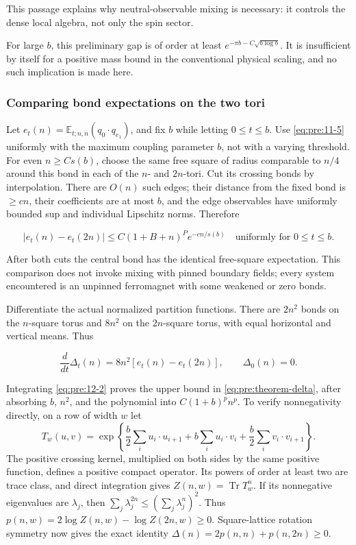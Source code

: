 This passage explains why neutral-observable mixing is necessary:
it controls the dense local algebra, not only the spin sector.

For large $b$, this preliminary gap is of order at least
$e^{-\pi b-C\sqrt{b\log b}}$. It is insufficient by itself for a positive mass bound in the conventional physical scaling, and no such implication is made here.

\subsubsection{Comparing bond expectations on the two tori}\label{pre:part-12-3}

Let \(e_t(n)=\mathbb E_{t;n,n}(q_0\cdot q_{e_1})\), and fix \(b\) while letting \(0\leq t\leq b\). Use \eqref{eq:pre:11-5} uniformly with the maximum coupling parameter \(b\), not with a varying threshold. For even \(n\geq Cs(b)\), choose the same free square of radius comparable to \(n/4\) around this bond in each of the \(n\)- and \(2n\)-tori. Cut its crossing bonds by interpolation. There are \(O(n)\) such edges; their distance from the fixed bond is \(\geq cn\), their coefficients are at most \(b\), and the edge observables have uniformly bounded sup and individual Lipschitz norms. Therefore

\begin{equation}
|e_t(n)-e_t(2n)|
\leq C(1+B+n)^P e^{-c n/s(b)}
\quad\text{uniformly for }0\leq t\leq b.
\label{eq:pre:12-2}
\end{equation}

After both cuts the central bond has the identical free-square expectation. This comparison does not invoke mixing with pinned boundary fields; every system encountered is an unpinned ferromagnet with some weakened or zero bonds.

Differentiate the actual normalized partition functions. There are \(2n^2\) bonds on the \(n\)-square torus and \(8n^2\) on the \(2n\)-square torus, with equal horizontal and vertical means. Thus

\begin{equation}
\frac{d}{dt}\Delta_t(n)=8n^2[e_t(n)-e_t(2n)],\qquad \Delta_0(n)=0.
\label{eq:pre:12-3}
\end{equation}

Integrating \eqref{eq:pre:12-2} proves the upper bound in \eqref{eq:pre:theorem-delta}, after absorbing \(b\), \(n^2\), and the polynomial into \(C(1+b)^pn^p\). To verify nonnegativity directly, on a row of width \(w\) let
\[
 T_w(u,v)=\exp\left\{\frac b2\sum_i u_i\cdot u_{i+1}
                 +b\sum_i u_i\cdot v_i
                 +\frac b2\sum_i v_i\cdot v_{i+1}\right\}.
\]
The positive crossing kernel, multiplied on both sides by the same
positive function, defines a positive compact operator. Its powers of
order at least two are trace class, and direct integration gives
\(Z(n,w)=\operatorname{Tr}T_w^n\). If its nonnegative eigenvalues are
\(\lambda_j\), then
\(\sum_j\lambda_j^{2n}\leq(\sum_j\lambda_j^n)^2\).
Thus \(p(n,w)=2\log Z(n,w)-\log Z(2n,w)\geq0\). Square-lattice rotation
symmetry now gives the exact identity
\(\Delta(n)=2p(n,n)+p(n,2n)\geq0\).

